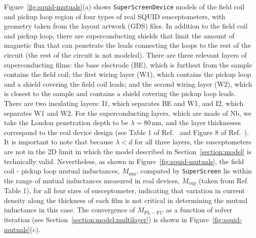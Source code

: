 \documentclass[final,3p,times,twocolumn]{elsarticle}
\newcommand{\inline}[1]{\texttt{#1}\xspace}
\newcommand{\SuperScreen}{\inline{SuperScreen}}
\newcommand{\nm}{\mathrm{nm}}
\begin{document}
Figure~\ref{fig:squid-mutuals}(a) shows \SuperScreen \inline{Device} models of the field coil and pickup loop region of four types of real SQUID susceptometers, with geometry taken from the layout artwork (GDS) files. In addition to the field coil and pickup loop, there are superconducting shields that limit the amount of magnetic flux that can penetrate the leads connecting the loops to the rest of the circuit (the rest of the circuit is not modeled). There are three relevant layers of superconducting films: the base electrode (BE), which is furthest from the sample contains the field coil; the first wiring layer (W1), which contains the pickup loop and a shield covering the field coil leads; and the second wiring layer (W2), which is closest to the sample and contains a shield covering the pickup loop leads. There are two insulating layers: I1, which separates BE and W1, and I2, which separates W1 and W2.
For the superconducting layers, which are made of Nb, we take the London penetration depth to be $\lambda = 80\,\nm$, and the layer thicknesses correspond to the real device design (see Table 1 of Ref.~\cite{Kirtley2016-gt} and Figure 8 of Ref.~\cite{Kirtley2016-zz}). It is important to note that because $\lambda < d$ for all three layers, the susceptometers are not in the 2D limit in which the model described in Section~\ref{section:model} is technically valid. Nevertheless, as shown in Figure~\ref{fig:squid-mutuals}, the field coil - pickup loop mutual inductances, $M_\mathrm{sim}$, computed by \SuperScreen lie within the range of mutual inductances measured in real devices, $M_\mathrm{exp}$ (taken from Ref.~\cite{Kirtley2016-zz} Table 1), for all four sizes of susceptometer, indicating that variation in current density along the thickness of each film is not critical in determining the mutual inductance in this case. The convergence of $M_\mathrm{PL-FC}$ as a function of solver iteration (see Section~\ref{section:model:multilayer}) is shown in Figure~\ref{fig:squid-mutuals}(c).
\end{document}
